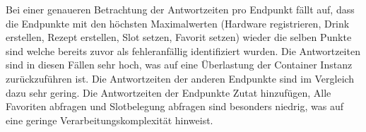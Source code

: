\begin{table}[!ht] 
    \centering
    \caption{Antwortzeiten je Endpunkt in Millisekunden}
    \label{tab:response_times}
\end{table}

Bei einer genaueren Betrachtung der Antwortzeiten pro Endpunkt fällt auf, dass die Endpunkte mit 
den höchsten Maximalwerten (Hardware registrieren, Drink erstellen, Rezept erstellen, Slot setzen, 
Favorit setzen) wieder die selben Punkte sind welche bereits zuvor als fehleranfällig identifiziert
wurden. Die Antwortzeiten sind in diesen Fällen sehr hoch, was auf eine Überlastung der Container 
Instanz zurückzuführen ist. Die Antwortzeiten der anderen Endpunkte sind im Vergleich dazu sehr
gering. Die Antwortzeiten der Endpunkte Zutat hinzufügen, Alle Favoriten abfragen und Slotbelegung
abfragen sind besonders niedrig, was auf eine geringe Verarbeitungskomplexität hinweist.

